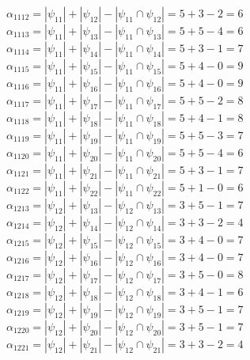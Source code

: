 \documentclass[a4paper,12pt]{article}
\begin{document}
$\alpha_{1112} = |\psi_{11}| + |\psi_{12}| - |\psi_{11} \cap \psi_{12}| = 5 + 3 - 2 = 6$\\
$\alpha_{1113} = |\psi_{11}| + |\psi_{13}| - |\psi_{11} \cap \psi_{13}| = 5 + 5 - 4 = 6$\\
$\alpha_{1114} = |\psi_{11}| + |\psi_{14}| - |\psi_{11} \cap \psi_{14}| = 5 + 3 - 1 = 7$\\
$\alpha_{1115} = |\psi_{11}| + |\psi_{15}| - |\psi_{11} \cap \psi_{15}| = 5 + 4 - 0 = 9$\\
$\alpha_{1116} = |\psi_{11}| + |\psi_{16}| - |\psi_{11} \cap \psi_{16}| = 5 + 4 - 0 = 9$\\
$\alpha_{1117} = |\psi_{11}| + |\psi_{17}| - |\psi_{11} \cap \psi_{17}| = 5 + 5 - 2 = 8$\\
$\alpha_{1118} = |\psi_{11}| + |\psi_{18}| - |\psi_{11} \cap \psi_{18}| = 5 + 4 - 1 = 8$\\
$\alpha_{1119} = |\psi_{11}| + |\psi_{19}| - |\psi_{11} \cap \psi_{19}| = 5 + 5 - 3 = 7$\\
$\alpha_{1120} = |\psi_{11}| + |\psi_{20}| - |\psi_{11} \cap \psi_{20}| = 5 + 5 - 4 = 6$\\
$\alpha_{1121} = |\psi_{11}| + |\psi_{21}| - |\psi_{11} \cap \psi_{21}| = 5 + 3 - 1 = 7$\\
$\alpha_{1122} = |\psi_{11}| + |\psi_{22}| - |\psi_{11} \cap \psi_{22}| = 5 + 1 - 0 = 6$\\
$\alpha_{1213} = |\psi_{12}| + |\psi_{13}| - |\psi_{12} \cap \psi_{13}| = 3 + 5 - 1 = 7$\\
$\alpha_{1214} = |\psi_{12}| + |\psi_{14}| - |\psi_{12} \cap \psi_{14}| = 3 + 3 - 2 = 4$\\
$\alpha_{1215} = |\psi_{12}| + |\psi_{15}| - |\psi_{12} \cap \psi_{15}| = 3 + 4 - 0 = 7$\\
$\alpha_{1216} = |\psi_{12}| + |\psi_{16}| - |\psi_{12} \cap \psi_{16}| = 3 + 4 - 0 = 7$\\
$\alpha_{1217} = |\psi_{12}| + |\psi_{17}| - |\psi_{12} \cap \psi_{17}| = 3 + 5 - 0 = 8$\\
$\alpha_{1218} = |\psi_{12}| + |\psi_{18}| - |\psi_{12} \cap \psi_{18}| = 3 + 4 - 1 = 6$\\
$\alpha_{1219} = |\psi_{12}| + |\psi_{19}| - |\psi_{12} \cap \psi_{19}| = 3 + 5 - 1 = 7$\\
$\alpha_{1220} = |\psi_{12}| + |\psi_{20}| - |\psi_{12} \cap \psi_{20}| = 3 + 5 - 1 = 7$\\
$\alpha_{1221} = |\psi_{12}| + |\psi_{21}| - |\psi_{12} \cap \psi_{21}| = 3 + 3 - 2 = 4$\\
\end{document}
